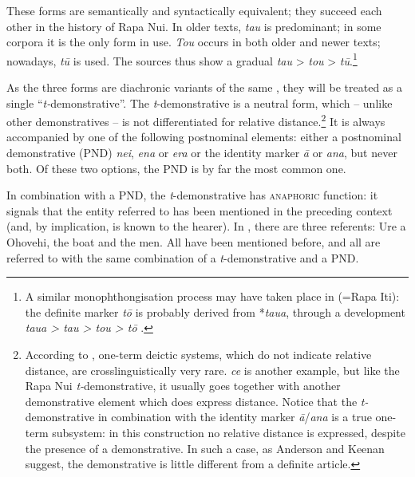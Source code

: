 These forms are semantically and syntactically equivalent; they succeed each other in the history of Rapa Nui. In older texts, \textit{tau} is predominant; in some corpora it is the only form in use. \textit{Tou} occurs in both older and newer texts; nowadays, \textit{tū} is used. The sources thus show a gradual  \textit{tau} {\textgreater} \textit{tou} {\textgreater} \textit{tū}.\footnote{\label{fn:212}A similar monophthongisation process may have taken place in  (=Rapa Iti): the definite marker \textit{tō} is probably derived from *\textit{taua}, through a development \textit{taua {\textgreater} tau {\textgreater} tou {\textgreater} tō} \citep[183]{Walworth2015Thesis}.} 

As the three forms are diachronic variants of the same , they will be treated as a single “\textit{t-}demonstrative”. The \textit{t}{}-demonstrative is a neutral form, which – unlike other demonstratives – is not differentiated for relative distance.\footnote{\label{fn:213}According to \citet[280]{AndersonKeenan1985}, one-term deictic systems, which do not indicate relative distance, are crosslinguistically very rare.  \textit{ce} is another example, but like the Rapa Nui \textit{t-}demonstrative, it usually goes together with another demonstrative element which does express distance. Notice that the \textit{t-}demonstrative in combination with the identity marker \textit{{\ꞌ}ā}/\textit{{\ꞌ}ana} is a true one-term subsystem: in this construction no relative distance is expressed, despite the presence of a demonstrative. In such a case, as Anderson and Keenan suggest, the demonstrative is little different from a definite article.}  It is always accompanied by one of the following postnominal elements: either a postnominal demonstrative (PND) \textit{nei}, \textit{ena} or \textit{era} or the identity marker \textit{{\ꞌ}ā} or \textit{{\ꞌ}ana}, but never both. Of these two options, the PND is by far the most common one.

In combination with a PND, the \textit{t}{}-demonstrative has \textsc{anaphoric} function: it signals that the entity referred to has been mentioned in the preceding context (and, by implication, is known to the hearer). In , there are three referents: Ure a Ohovehi, the boat and the men. All have been mentioned before, and all are referred to with the same combination of a \textit{t}{}-demonstrative and a PND. 

